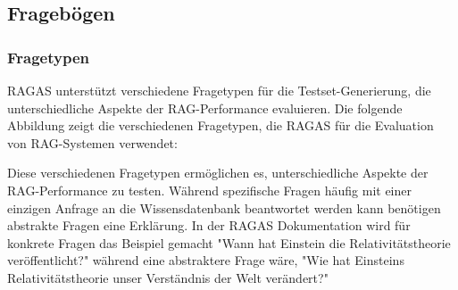 \subsection{Fragebögen}

\subsubsection{Fragetypen}

RAGAS unterstützt verschiedene Fragetypen für die Testset-Generierung, die unterschiedliche Aspekte der RAG-Performance evaluieren.
Die folgende Abbildung zeigt die verschiedenen Fragetypen, die RAGAS für die Evaluation von RAG-Systemen verwendet:

\begin{center}
\end{center}
    

Diese verschiedenen Fragetypen ermöglichen es, unterschiedliche Aspekte der RAG-Performance zu testen.
Während spezifische Fragen häufig mit einer einzigen Anfrage an die Wissensdatenbank beantwortet werden kann benötigen abstrakte Fragen eine Erklärung.
In der RAGAS Dokumentation \cite{ragas_query_types} wird für konkrete Fragen das Beispiel gemacht "Wann hat Einstein die Relativitätstheorie veröffentlicht?" während eine abstraktere Frage wäre, "Wie hat Einsteins Relativitätstheorie unser Verständnis der Welt verändert?"

